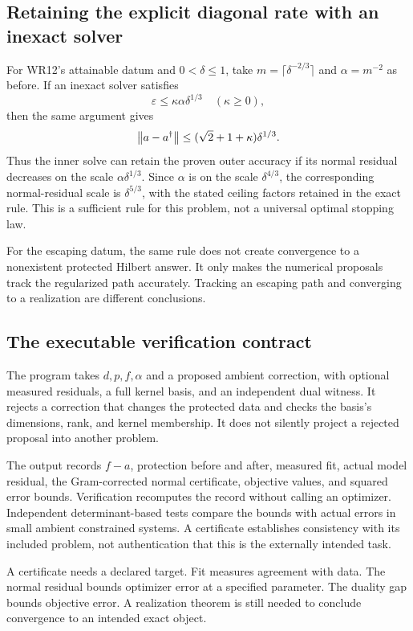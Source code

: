 \subsection{Retaining the explicit diagonal rate with an inexact solver}
For WR12's attainable datum and $0<\delta\le1$, take $m=\lceil\delta^{-2/3}\rceil$ and $\alpha=m^{-2}$ as before. If an inexact solver satisfies
\[
 \varepsilon\le\kappa\alpha\delta^{1/3}
 \quad(\kappa\ge0),
\]
then the same argument gives
\[
 \left\lVert a-a^\dagger\right\rVert\le(\sqrt2+1+\kappa)\delta^{1/3}.
\]
Thus the inner solve can retain the proven outer accuracy if its normal residual decreases on the scale $\alpha\delta^{1/3}$. Since $\alpha$ is on the scale $\delta^{4/3}$, the corresponding normal-residual scale is $\delta^{5/3}$, with the stated ceiling factors retained in the exact rule. This is a sufficient rule for this problem, not a universal optimal stopping law.


For the escaping datum, the same rule does not create convergence to a nonexistent protected Hilbert answer. It only makes the numerical proposals track the regularized path accurately. Tracking an escaping path and converging to a realization are different conclusions.

\subsection{The executable verification contract}
The program takes $d,p,f,\alpha$ and a proposed ambient correction, with optional measured residuals, a full kernel basis, and an independent dual witness. It rejects a correction that changes the protected data and checks the basis's dimensions, rank, and kernel membership. It does not silently project a rejected proposal into another problem.

The output records $f-a$, protection before and after, measured fit, actual model residual, the Gram-corrected normal certificate, objective values, and squared error bounds. Verification recomputes the record without calling an optimizer. Independent determinant-based tests compare the bounds with actual errors in small ambient constrained systems. A certificate establishes consistency with its included problem, not authentication that this is the externally intended task.

\begin{insight}
A certificate needs a declared target. Fit measures agreement with data. The normal residual bounds optimizer error at a specified parameter. The duality gap bounds objective error. A realization theorem is still needed to conclude convergence to an intended exact object.
\end{insight}
